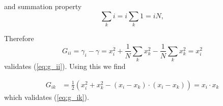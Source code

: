 \documentclass[12pt]{article}
\begin{document}
and summation property
\begin{equation}
    \sum_k i = i \sum_k 1 = iN,
    \label{eq:sumdiff}
\end{equation}
\fi

Therefore
\begin{equation*}
    G_{ii} =\gamma_i-\gamma = x_i^2 + \frac{1}{N}\sum_k x_k^2 - \frac{1}{N}\sum_k x_k^2 = x_i^2
    \label{eq:g_ii_proof}
\end{equation*}
validates (\ref{eq:g_ii}). Using this we find

\begin{equation*}
    \begin{split}
        G_{ik} &= \frac12(x_i^2 + x_k^2 - (x_i - x_k) \cdot (x_i - x_k))
        = x_i \cdot x_k    
    \end{split}
    \label{eq:g_ik1}
\end{equation*}
which validates (\ref{eq:g_ik}).
\end{document}
